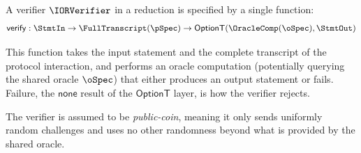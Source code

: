 \begin{definition}
    \label{def:verifier}
    A verifier \(\IORVerifier\) in a reduction is specified by a single function:
    \begin{equation*} \mathsf{verify} : \StmtIn \to \FullTranscript(\pSpec) \to \mathsf{OptionT}(\OracleComp(\oSpec), \StmtOut) \end{equation*}

    This function takes the input statement and the complete transcript of the protocol interaction, and performs an oracle computation (potentially querying the shared oracle \(\oSpec\)) that either produces an output statement or fails. Failure, the \(\mathsf{none}\) result of the \(\mathsf{OptionT}\) layer, is how the verifier rejects.

    The verifier is assumed to be \emph{public-coin}, meaning it only sends uniformly random challenges and uses no other randomness beyond what is provided by the shared oracle.
    \leanok
\end{definition}

